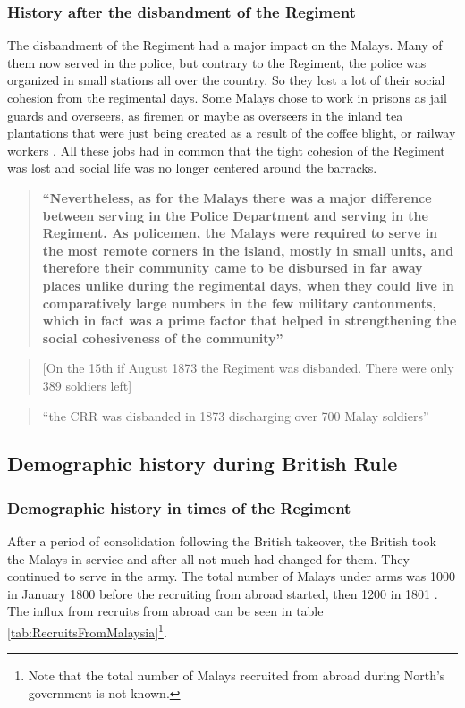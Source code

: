 \subsubsection{History after the disbandment of the Regiment}\label{sec:slmbg:HistoryafterthedisbandmentoftheRegiment}
The disbandment of the Regiment had a major impact on the Malays.
Many of them now served in the police, but contrary to the
Regiment, the police was organized in small stations all over the
country. So they lost a lot of their social cohesion from the
regimental days. Some Malays chose to work in prisons as jail
guards and overseers, as firemen or maybe as overseers in the
inland tea plantations that were just being created as a result of
the coffee blight, or railway workers \citep[10]{Saldin2003}. All
these jobs had in common that the tight cohesion of the Regiment
was lost and social life was no longer centered around the
barracks.

\begin{quote}
    \textbf{``Nevertheless, as for the Malays there was a major difference between serving in the Police Department and serving in the Regiment. As policemen, the Malays were required to serve in the most remote corners in the island, mostly in small units, and therefore their community came to be disbursed in far away places unlike during the regimental days, when they could live in comparatively large numbers in the few military cantonments, which in fact was a prime factor that helped in strengthening the social cohesiveness of the community''}\citep[194]{Hussainmiya1990}
\end{quote}


\begin{quote}
    [On the 15th if August 1873 the Regiment was disbanded. There were only 389 soldiers left]\citep[103]{Hussainmiya1990}
\end{quote}

\begin{quote}
    ``the CRR was disbanded in 1873 discharging over 700 Malay soldiers''\citep[99]{Hussainmiya1990}
\end{quote}

\subsection{Demographic history during British Rule}\label{sec:slmbg:DemographichistoryduringBritishRule}
\subsubsection{Demographic history in times of the Regiment}\label{sec:slmbg:DemographichistoryintimesoftheRegiment}
After a period of consolidation following the British takeover,
the British took the Malays in service and after all not much had
changed for them. They continued to serve in the army. The total
number of Malays under arms was 1000 in January 1800 before the
recruiting from abroad started, then 1200 in 1801
\citet[62]{Hussainmiya1990}. The influx from recruits from abroad
can be seen in table \ref{tab:RecruitsFromMalaysia}\footnote{Note
that the total number of Malays recruited from abroad during
North's government is not known.}.

